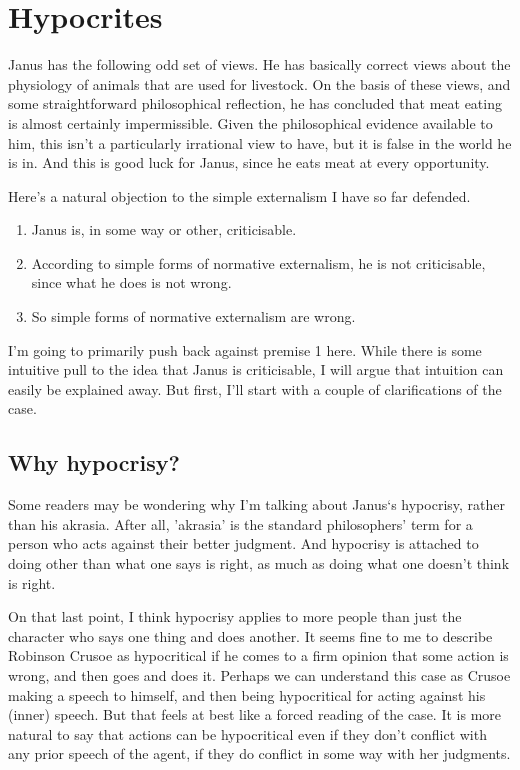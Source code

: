 \documentclass[
  10pt,
  letterpaper,
  twoside]{scrbook}
\providecommand{\tightlist}{%
  \setlength{\itemsep}{0pt}\setlength{\parskip}{0pt}}\usepackage{longtable,booktabs,array}
\begin{document}
\section{Hypocrites}\label{hypocrites}

{Janus} has the following odd set of views. He has basically correct
views about the physiology of animals that are used for livestock. On
the basis of these views, and some straightforward philosophical
reflection, he has concluded that meat eating is almost certainly
impermissible. Given the philosophical evidence available to him, this
isn't a particularly irrational view to have, but it is false in the
world he is in. And this is good luck for {Janus}, since he eats meat at
every opportunity.

Here's a natural objection to the simple externalism I have so far
defended.

\begin{enumerate}
\def\labelenumi{\arabic{enumi}.}
\tightlist
\item
  {Janus} is, in some way or other, criticisable.
\item
  According to simple forms of normative externalism, he is not
  criticisable, since what he does is not wrong.
\item
  So simple forms of normative externalism are wrong.
\end{enumerate}

I'm going to primarily push back against premise 1 here. While there is
some intuitive pull to the idea that {Janus} is criticisable, I will
argue that intuition can easily be explained away. But first, I'll start
with a couple of clarifications of the case.

\subsection{Why hypocrisy?}\label{whyhypocrisy}

Some readers may be wondering why I'm talking about {Janus}`s hypocrisy,
rather than his akrasia. After all, 'akrasia' is the standard
philosophers' term for a person who acts against their better judgment.
And hypocrisy is attached to doing other than what one says is right, as
much as doing what one doesn't think is right.

On that last point, I think hypocrisy applies to more people than just
the character who says one thing and does another. It seems fine to me
to describe Robinson Crusoe as hypocritical if he comes to a firm
opinion that some action is wrong, and then goes and does it. Perhaps we
can understand this case as Crusoe making a speech to himself, and then
being hypocritical for acting against his (inner) speech. But that feels
at best like a forced reading of the case. It is more natural to say
that actions can be hypocritical even if they don't conflict with any
prior speech of the agent, if they do conflict in some way with her
judgments.
\end{document}
